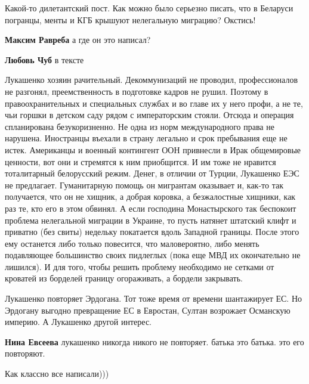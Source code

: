 \begin{itemize}

Какой-то дилетантский пост. Как можно было серьезно писать, что в Беларуси
погранцы, менты и КГБ крышуют нелегальную миграцию? Окстись!

\begin{itemize} %
\textbf{Максим Равреба} а где он это написал?

\textbf{Любовь Чуб} в тексте
\end{itemize} %


Лукашенко хозяин рачительный. Декоммунизаций не проводил, профессионалов не
разгонял, преемственность в подготовке кадров не рушил. Поэтому в
правоохранительных и специальных службах и во главе их у него профи, а не те,
чьи горшки в детском саду рядом с императорским стояли. Отсюда и операция
спланирована безукоризненно. Не одна из норм международного права не нарушена.
Иностранцы въехали в страну легально и срок пребывания еще не истек. Американцы
и военный контингент ООН привнесли в Ирак общемировые ценности, вот они и
стремятся к ним приобщится. И им тоже не нравится тоталитарный белорусский
режим. Денег, в отличии от Турции, Лукашенко ЕЭС не предлагает. Гуманитарную
помощь он мигрантам оказывает и, как-то так получается, что он не хищник, а
добрая коровка, а безжалостные хищники, как раз те, кто его в этом обвинял. А
если господина Монастырского так беспокоит проблема нелегальной миграции в
Украине, то пусть натянет штатский клифт и приватно (без свиты) недельку
покатается вдоль Западной границы. После этого ему останется либо только
повесится, что маловероятно, либо менять подавляющее большинство своих
пидлеглых (пока еще МВД их окончательно не лишился). И для того, чтобы решить
проблему необходимо не сетками от кроватей из борделей границу огораживать, а
бордели закрывать.


Лукашенко повторяет Эрдогана. Тот тоже время от времени шантажирует ЕС. Но
Эрдогану выгодно превращение ЕС в Евростан, Султан возрожает Османскую империю.
А Лукашенко другой интерес.

\begin{itemize} %
\textbf{Нина Евсеева} лукашенко никогда никого не повторяет. батька это батька. это его повторяют.
\end{itemize} %

Как классно все написали)))


\end{itemize}
